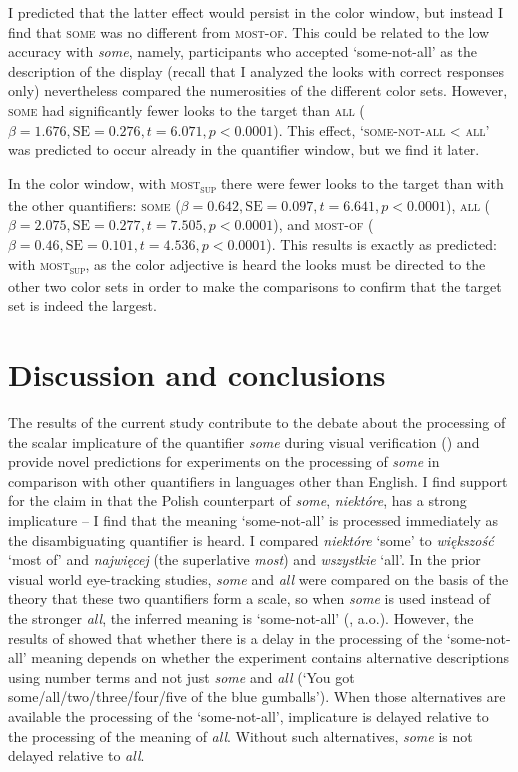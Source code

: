 \documentclass[output=paper]{langscibook}
\begin{document}
I predicted that the latter effect would persist in the color window, but instead I find that \textsc{some} was no
different from \textsc{most-of}. This could be related to the low accuracy with \textit{some}, namely, participants who
accepted `some-not-all' as the description of the display (recall that I analyzed the looks with correct
responses only) nevertheless compared the numerosities of the different color sets. However, \textsc{some} had
significantly fewer looks to the target than \textsc{all} ($\beta =1.676, \text{SE}=0.276, t=6.071,
p<0.0001$). This effect, `\textsc{some-not-all} {\textless} \textsc{all}' was predicted to occur
already in the quantifier window, but we find it later.

In the color window, with \textsc{most\textsubscript{sup}} there were fewer looks to the target than with the other
quantifiers: \textsc{some} ($\beta =0.642, \text{SE}=0.097, t=6.641, p<0.0001$), \textsc{all}
($\beta =2.075, \text{SE}=0.277, t=7.505, p<0.0001$), and \textsc{most-of} ($\beta =0.46,
\text{SE}=0.101, t=4.536, p<0.0001$). This results is exactly as predicted: with
\textsc{most\textsubscript{sup}}, as the color adjective is heard the looks must be directed to the other two
color sets in order to make the comparisons to confirm that the target set is indeed the largest.


\section{Discussion and conclusions} 

The results of the current study contribute to the debate about the processing of the scalar implicature of the
quantifier \textit{some }during visual verification (\citealt{huang2009online,grodner2010some,degen2011making,huang2011logic,degen2016availability}) and provide novel predictions for experiments on the processing of \textit{some} in
comparison with other quantifiers in languages other than English. I find support for the claim in \citet{spychalska-msc}
that the Polish counterpart of \textit{some}, \textit{niektóre}, has a strong implicature – I find that the meaning
`some-not-all' is processed immediately as the disambiguating quantifier is heard. I compared \textit{niektóre} `some'
to \textit{większość} `most of' and \textit{najwięcej} (the superlative \textit{most}) and \textit{wszystkie
} `all'. In the prior visual world eye-tracking studies, \textit{some} and \textit{all} were compared on the
basis of the theory that these two quantifiers form a scale, so when \textit{some} is used instead of the stronger
\textit{all}, the inferred meaning is `some-not-all' (\citealt{horn1972,Levinson1983}, a.o.). However, the results of \citet{degen2011making,degen2016availability} showed that whether there is a delay in the processing of the `some-not-all'
meaning depends on whether the experiment contains alternative descriptions using number terms and not just
\textit{some} and \textit{all} (`You got some/all/two/three/four/five of the blue gumballs'). When those alternatives
are available the processing of the `some-not-all', implicature is delayed relative to the processing of the
meaning of \textit{all}. Without such alternatives, \textit{some} is not delayed relative to \textit{all}. 
\end{document}
